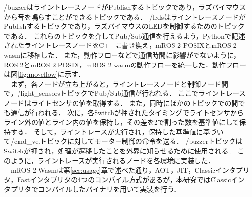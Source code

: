 /buzzerはライントレースノードがPublishするトピックであり，ラズパイマウスから音を鳴らすことができるトピックである．
/ledsはライントレースノードがPublishするトピックであり，ラズパイマウスのLEDを制御するためのトピックである．
これらのトピックを介してPub/Sub通信を行えるよう，Pythonで記述されたライントレースノードをC++に書き換え，mROS 2-POSIXとmROS 2-wasmに移植した．
また，動作フローなどで通信時間に影響がでないように，ROS 2とmROS 2-POSIX，mROS 2-wasmの動作フローを統一した．動作フローは図\ref{fig:moveflow}に示す．
\\　まず，各ノードが立ち上がると，ライントレースノードと制御ノード間で，/light\_sensorsトピックでPub/Sub通信が行われる．
ここでライントレースノードはライトセンサの値を取得する．
また，同時にほかのトピックでの間でも通信が行われる．
次に，各Switchが押されたタイミングでライトセンサからライン外の値とライン内の値を保持し，その差を2で割った数を基準値にして保持する．
そして，ライントレースが実行され，保持した基準値に基づいて/cmd\_velトピックに対してモーター制御の命令を送る．
/buzzerトピックはSwitchが押され，処理が遷移したことを外界に知らせるために使用される．
このように，ライントレースが実行されるノードを各環境に実装した．
\\　mROS 2-Wasmは第\ref{sec:usage}章で述べた通り，AOT，JIT，Classicインタプリタ，Fastインタプリタの4つのコンパイル方式があるが，本研究ではClassicインタプリタでコンパイルしたバイナリを用いて実装を行う．


